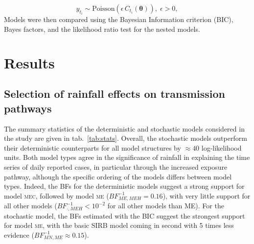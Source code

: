 \begin{equation}
 y_{t_i}  \sim \text{Poisson}\left(\epsilon \,C_{t_i}(\boldsymbol{\theta})\right), \; \epsilon > 0,
 \label{eq:obs}
\end{equation}
 Models were then compared using the Bayesian Information criterion (BIC), Bayes factors, and the likelihood ratio test for the nested models.
 
 
\section{Results}

\subsection{Selection of rainfall effects on transmission pathways}
The summary statistics of the deterministic and stochastic models considered in the study are given in tab.~\ref{tab:stats}. Overall, the stochastic models outperform their deterministic counterparts for all model structures by $\approx 40$ log-likelihood units. Both model types agree in the significance of rainfall in explaining the time series of daily reported cases, in particular through the increased exposure pathway, although the specific ordering of the models differs between model types. Indeed, the BFs for the deterministic models suggest a strong support for model \textsc{mec}, followed by model \textsc{me} ($BF^{-1}_{ME,MEH} = 0.16$), with very little support for all other models ($BF^{-1}_{\boldsymbol{\cdot},MEH}< 10^{-2}$ for all other models than ME). For the stochastic model, the BFs estimated with the BIC suggest the strongest support for model \textsc{me}, with the basic SIRB model coming in second with 5 times less evidence ($BF^{-1}_{MN,ME} \approx 0.15$). 
